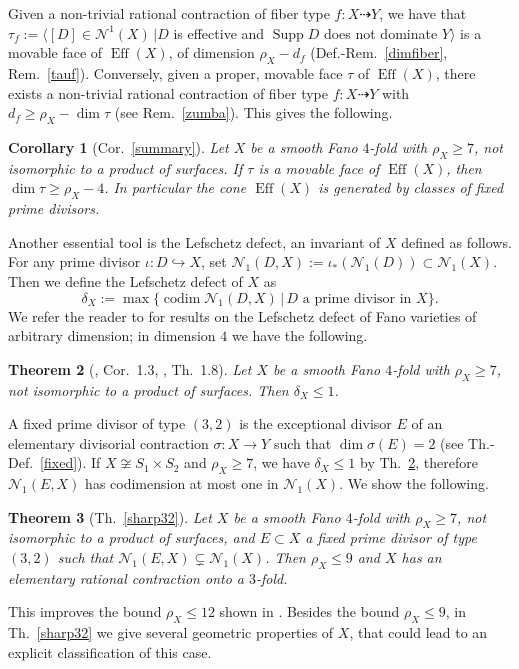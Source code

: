\documentclass[a4paper,12pt]{amsart}
\newtheorem{thm}{Theorem}[section]
\newtheorem{corollary}[thm]{Corollary}
\theoremstyle{definition}
\numberwithin{figure}{section}
\numberwithin{table}{section}
\newcommand{\N}{\mathcal{N}_1}
\newcommand{\Nu}{\mathcal{N}^1}
\newcommand{\Supp}{\operatorname{Supp}}
\newcommand{\codim}{\operatorname{codim}}
\newcommand{\Eff}{\operatorname{Eff}}
\begin{document}
Given a non-trivial rational contraction of fiber type $f\colon X\dasharrow Y$, we have that $\tau_f:=\langle [D]\in\Nu(X)\,|D$ is effective and $\Supp D$ does not dominate $Y\rangle$ is a movable face of $\Eff(X)$, of dimension $\rho_X-d_f$ (Def.-Rem.~\ref{dimfiber}, Rem.~\ref{tauf}). Conversely, given a proper, movable face $\tau$ of $\Eff(X)$, there exists a non-trivial rational contraction of fiber type $f\colon X\dasharrow Y$ with $d_f\geq\rho_X-\dim\tau$ (see Rem.~\ref{zumba}). This gives the following.
\begin{corollary}[Cor.~\ref{summary}]\label{summaryintro}
 Let $X$ be a smooth Fano $4$-fold with $\rho_X\geq 7$, not isomorphic to a product of surfaces.
  If $\tau$ is a movable face of $\Eff(X)$, then 
  $\dim\tau\geq\rho_X-4$. In particular the cone $\Eff(X)$ is generated by classes of fixed prime divisors.
\end{corollary}

\bigskip

Another essential tool 
is the Lefschetz defect, an invariant of $X$ defined as follows. 
For any prime divisor $\iota\colon D\hookrightarrow X$, set $\N(D,X):=\iota_*(\N(D))\subset\N(X)$. Then we define the Lefschetz defect of $X$ as
$$\delta_X:=\max\{\codim\N(D,X)\,|\,D\text{ a prime divisor in }X\}.$$
We refer the reader to \cite{codim,delta3} for results on the Lefschetz defect of Fano varieties of arbitrary dimension; in dimension $4$ we have the following.
\begin{thm}[\cite{codim}, Cor.~1.3, \cite{3folds}, Th.~1.8]\label{starting}
Let $X$ be a smooth Fano $4$-fold with $\rho_X\geq 7$, not isomorphic to a product of surfaces. Then $\delta_X\leq 1$.
\end{thm}  
 
\medskip

A fixed prime divisor  of type $(3,2)$ is  the exceptional divisor $E$ of an elementary divisorial contraction $\sigma\colon X\to Y$ such that $\dim \sigma(E)=2$ (see Th.-Def.~\ref{fixed}). If $X\not\cong S_1\times S_2$ and $\rho_X\geq 7$, we have $\delta_X\leq 1$ by Th.~\ref{starting}, therefore $\N(E,X)$ has  codimension at most one in $\N(X)$. We show the following.
\begin{thm}[Th.~\ref{sharp32}]\label{sharp32intro}
  Let $X$ be a smooth Fano $4$-fold with $\rho_X\geq 7$, not isomorphic to a product of surfaces, and $E\subset X$ a fixed prime divisor of type $(3,2)$ such that $\N(E,X)\subsetneq\N(X)$.
  Then $\rho_X\leq 9$ and
  $X$ has an elementary rational contraction onto a  $3$-fold.
\end{thm}
This improves the bound $\rho_X\leq 12$ shown in  \cite[Prop.~5.32]{blowup}. Besides the bound $\rho_X\leq 9$, in Th.~\ref{sharp32} we give several geometric properties of $X$, that could lead to an explicit classification of this case.
\end{document}
